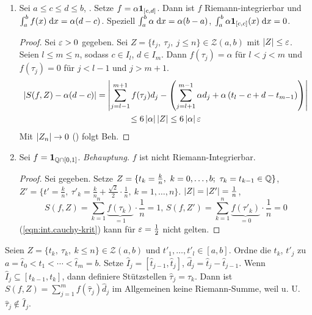 \documentclass[12pt]{scrreprt}
\begin{document}
\begin{bsp}
  \label{bsp:int.r-int}
  \begin{enumerate}
    \item \label{bsp:int.r-int.a} Sei $a\le c\le d\le b$,
      \reell{\alpha}. Setze $f=\alpha\mathbf{1}_{[c,d]}$. Dann ist $f$
      Riemann-integrierbar und
      $\int_{a}^{b}{f(x)}\;\mathrm{d}x=\alpha(d-c)$. Speziell
      $\int_{a}^{b}{\alpha}\;\mathrm{d}x=\alpha(b-a)$,
      $\int_{a}^{b}{\alpha\mathbf{1}_{[c,c]}(x)}\;\mathrm{d}x=0$.
      \begin{proof}
        Sei $\varepsilon>0$ gegeben. Sei $Z=\{t_j,\ \tau_j,\ j\le
        n\}\in\mathcal{Z}(a,b)$ mit $\left\lvert Z\right\lvert\le\varepsilon$. Seien $l\le m\le
        n$, sodass $c\in I_l$, $d\in I_m$. Dann $f(\tau_j)=\alpha$ für
        $l<j<m$ und $f(\tau_j)=0$ für $j<l-1$ und $j>m+1$.
        \begin{multline*}
          \left\lvert S(f,Z)-\alpha(d-c)\right\lvert =
          \left\lvert\sum_{j=l-1}^{m+1}{f(\tau_j)d_j}-\left(\sum_{j=l+1}^{m-1}{\alpha
                d_j}+\alpha\left(t_l-c+d-t_{m-1}\right)\right)\right\lvert \\
          \le 6\left\lvert\alpha\right\lvert\left\lvert Z\right\lvert \le 6\left\lvert\alpha\right\lvert\varepsilon
        \end{multline*}
        Mit $\left\lvert Z_n\right\lvert\to0$ (\ninf) folgt Beh.
      \end{proof}
    \item \label{bsp:int.r-int.b} Sei
      $f=\mathbf{1}_{\mathbb{Q}\cap[0,1]}$. \emph{Behauptung.} $f$ ist
      nicht Riemann-Integrierbar.
      \begin{proof}
        Sei  gegeben. Setze $Z=\{t_k=\frac{k}{n},\ 
        k=0,\dotsc,b;\ \tau_k=t_{k-1}\in\set{Q}\}$,
        $Z'=\{t'=\frac{k}{n},\ 
        \tau'_k=\frac{k}{n}+\frac{\sqrt{2}}{2}\cdot\frac1n,\
        k=1,\dotsc,n\}$. \folgt $\left\lvert Z\right\lvert=\left\lvert Z'\right\lvert=\frac1n$,
        \[S(f,Z) =
        \sum_{k=1}^n{\underbrace{f(\tau_k)}_{=1}\cdot\frac1n}=1
        \text{, } S(f,Z') =
        \sum_{k=1}^n{\underbrace{f(\tau'_k)}_{=0}\cdot\frac1n}=0\]
        \folgt (\ref{eqn:int.cauchy-krit}) kann für $\varepsilon=\frac12$
        nicht gelten.
      \end{proof}
  \end{enumerate}
\end{bsp}

\begin{bem}[Verfeinerung]
  \label{bem:int.verfeinerung}
  Seien $Z=\{t_k,\ \tau_k,\ k\le n\}\in\mathcal{Z}(a,b)$ und
  $t'_1,\dotsc,t'_l\in[a,b]$. Ordne die $t_k$, $t'_j$ zu
  $a=\hat{t}_0<\hat{t}_1<\dotsb<\hat{t}_m=b$. Setze
  $\hat{I}_j=[\hat{t}_{j-1},\hat{t}_j]$,
  $\hat{d}_j=\hat{t}_j-\hat{t}_{j-1}$. Wenn
  $\hat{I}_j\subseteq[t_{k-1},t_k]$, dann definiere Stützstellen
  $\hat{\tau}_j=\tau_k$. Dann ist
  $S(f,Z)=\sum_{j=1}^m{f(\hat{\tau}_j)\hat{d}_j}$ im Allgemeinen keine
  Riemann-Summe, weil u. U. $\hat{\tau}_j\not\in\hat{I}_j$.
\end{bem}
\end{document}
